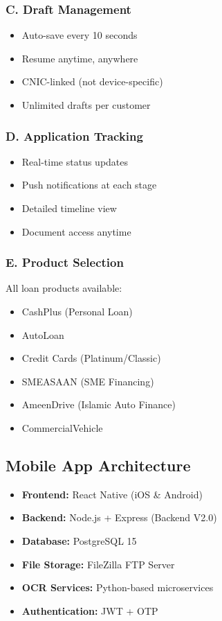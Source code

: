 \documentclass[12pt,a4paper]{article}
\begin{document}
\subsubsection{C. Draft Management}
\begin{itemize}
    \item Auto-save every 10 seconds
    \item Resume anytime, anywhere
    \item CNIC-linked (not device-specific)
    \item Unlimited drafts per customer
\end{itemize}

\subsubsection{D. Application Tracking}
\begin{itemize}
    \item Real-time status updates
    \item Push notifications at each stage
    \item Detailed timeline view
    \item Document access anytime
\end{itemize}

\subsubsection{E. Product Selection}

All loan products available:
\begin{itemize}[noitemsep]
    \item CashPlus (Personal Loan)
    \item AutoLoan
    \item Credit Cards (Platinum/Classic)
    \item SMEASAAN (SME Financing)
    \item AmeenDrive (Islamic Auto Finance)
    \item CommercialVehicle
\end{itemize}

\subsection{Mobile App Architecture}

\begin{itemize}
    \item \textbf{Frontend:} React Native (iOS \& Android)
    \item \textbf{Backend:} Node.js + Express (Backend V2.0)
    \item \textbf{Database:} PostgreSQL 15
    \item \textbf{File Storage:} FileZilla FTP Server
    \item \textbf{OCR Services:} Python-based microservices
    \item \textbf{Authentication:} JWT + OTP
\end{itemize}
\end{document}
